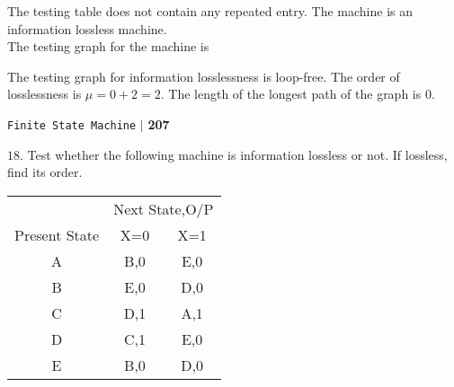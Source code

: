 \documentclass{article}
\begin{document}
\hspace*{0.1cm} The testing table does not contain any repeated entry. The machine is an information lossless machine.\\
\hspace*{0.1cm} The testing graph for the machine is

\begin{center}
\end{center}


\hspace*{0.1cm} The testing graph for information losslessness is loop-free. The order of losslessness is $\mu = 0 + 2 = 2$. The length of the longest path of the graph is 0.


\newpage

\begin{flushright}
\texttt{Finite State Machine} \hspace*{0.1cm}\textbf{$|$} \hspace*{0.1cm} \textbf{207}\hspace*{0.1cm}
\end{flushright}
\vspace*{0.5cm}


$18.$ Test whether the following machine is information lossless or not. If lossless, find its order.

\begin{center}
\begin{tabular}{ccc}
 \hline

 \hline

 \hline

 \hline
 & \multicolumn{2}{c}{Next State,O/P}\\
 \cline{2-3}
Present State & X=0           &   X=1\\
\hline
    A    &  B,0  & E,0 \\
    B    &  E,0  & D,0 \\
    C    &  D,1  & A,1 \\
    D    &  C,1  & E,0 \\
    E    &  B,0  & D,0 \\
 \hline

 \hline

 \hline

 \hline
\end{tabular}
\end{center}
\end{document}
